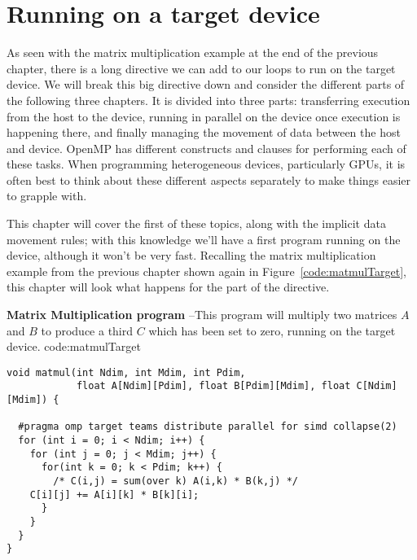 
\def\ArtDir{03.Target/figures}%
 
\chapter{Running on a target device}
\label{chapter:target}

As seen with the matrix multiplication example at the end of the previous chapter, there is a long directive we can add to our loops to run on the target device.
We will break this big directive down and consider the different parts of the following three chapters.
It is divided into three parts: transferring execution from the host to the device, running in parallel on the device once execution is happening there, and finally managing the movement of data between the host and device.
OpenMP has different constructs and clauses for performing each of these tasks.
When programming heterogeneous devices, particularly GPUs, it is often best to think about these different aspects separately to make things easier to grapple with.

This chapter will cover the first of these topics, along with the implicit data movement rules; with this knowledge we'll have a first program running on the device, although it won't be very fast.
Recalling the matrix multiplication example from the previous chapter shown again in Figure~\ref{code:matmulTarget}, this chapter will look what happens for the  part of the directive.

\begin{CodeExample}%
{\textbf{Matrix Multiplication program} --\small This program will multiply two matrices $A$ and $B$
to produce a third $C$ which has been set to zero, running on the target device.
}%
{code:matmulTarget}
\begin{lstlisting}
void matmul(int Ndim, int Mdim, int Pdim,
            float A[Ndim][Pdim], float B[Pdim][Mdim], float C[Ndim][Mdim]) {

  #pragma omp target teams distribute parallel for simd collapse(2)
  for (int i = 0; i < Ndim; i++) {
    for (int j = 0; j < Mdim; j++) {
      for(int k = 0; k < Pdim; k++) {
        /* C(i,j) = sum(over k) A(i,k) * B(k,j) */
	C[i][j] += A[i][k] * B[k][i];
      }
    }
  }
}
\end{lstlisting}
\end{CodeExample}

